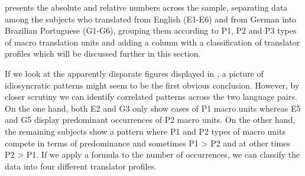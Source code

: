 \documentclass[output=paper]{LSP/langsci}
\begin{document}
 presents the absolute and relative numbers across the sample, separating data among the subjects who translated from English (E1-E6) and from German into Brazilian Portuguese (G1-G6), grouping them according to P1, P2 and P3 types of macro translation units and adding a column with a classification of translator profiles which will be discussed further in this section.


\begin{table}
\caption{Absolute and relative numbers for P1, P2 and P3 per subject and corresponding profiles}
\label{tab:alves:2}
\end{table}

If we look at the apparently disparate figures displayed in , a picture of idiosyncratic patterns might seem to be the first obvious conclusion. However, by closer scrutiny we can identify correlated patterns across the two language pairs. On the one hand, both E2 and G3 only show cases of P1 macro units whereas E5 and G5 display predominant occurrences of P2 macro units. On the other hand, the remaining subjects show a pattern where P1 and P2 types of macro units compete in terms of predominance and sometimes P1 {\textgreater} P2 and at other times P2 {\textgreater} P1. If we apply a formula to the number of occurrences, we can classify the data into four different translator profiles.
\end{document}
